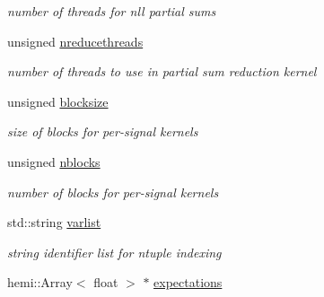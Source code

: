 \begin{DoxyCompactItemize}
\begin{DoxyCompactList}\small\item\em number of threads for nll partial sums \item\end{DoxyCompactList}\item 
\hypertarget{classMCMC_a67d0ec8275be35be9bbb74fae8821bc6}{
unsigned \hyperlink{classMCMC_a67d0ec8275be35be9bbb74fae8821bc6}{nreducethreads}}
\label{classMCMC_a67d0ec8275be35be9bbb74fae8821bc6}

\begin{DoxyCompactList}\small\item\em number of threads to use in partial sum reduction kernel \item\end{DoxyCompactList}\item 
\hypertarget{classMCMC_a2259fe2a0027b6b3916e67fbf535e5a7}{
unsigned \hyperlink{classMCMC_a2259fe2a0027b6b3916e67fbf535e5a7}{blocksize}}
\label{classMCMC_a2259fe2a0027b6b3916e67fbf535e5a7}

\begin{DoxyCompactList}\small\item\em size of blocks for per-\/signal kernels \item\end{DoxyCompactList}\item 
\hypertarget{classMCMC_a9e11b4edfaa324abccebd15e5dc96be0}{
unsigned \hyperlink{classMCMC_a9e11b4edfaa324abccebd15e5dc96be0}{nblocks}}
\label{classMCMC_a9e11b4edfaa324abccebd15e5dc96be0}

\begin{DoxyCompactList}\small\item\em number of blocks for per-\/signal kernels \item\end{DoxyCompactList}\item 
\hypertarget{classMCMC_a64e03c6f7d909bdd78ab47e82a378979}{
std::string \hyperlink{classMCMC_a64e03c6f7d909bdd78ab47e82a378979}{varlist}}
\label{classMCMC_a64e03c6f7d909bdd78ab47e82a378979}

\begin{DoxyCompactList}\small\item\em string identifier list for ntuple indexing \item\end{DoxyCompactList}\item 
\hypertarget{classMCMC_afe9e36e8bd4bc6658f751ad43b0d58dd}{
hemi::Array$<$ float $>$ $\ast$ \hyperlink{classMCMC_afe9e36e8bd4bc6658f751ad43b0d58dd}{expectations}}
\label{classMCMC_afe9e36e8bd4bc6658f751ad43b0d58dd}


\end{DoxyCompactItemize}
